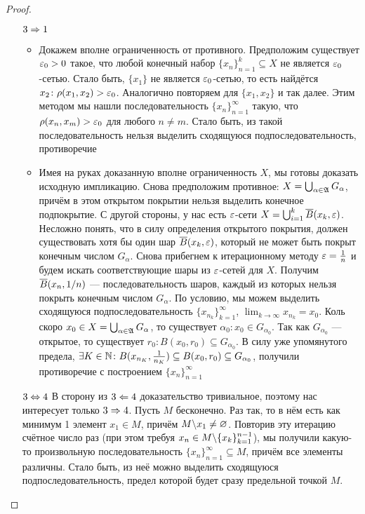 \begin{proof}
\begin{enumerate}
		\item[$3 \Rightarrow 1$] 
		\begin{itemize}
			\item Докажем вполне ограниченность от противного. Предположим существует $\varepsilon_0 > 0$ такое, что любой конечный набор $\{x_n\}_{n = 1}^k \subseteq X$ не является $\varepsilon_0$-сетью. Стало быть, $\{x_1\}$ не является $\varepsilon_0$-сетью, то есть найдётся $x_2 \colon \rho(x_1, x_2) > \varepsilon_0$. Аналогично повторяем для $\{x_1, x_2\}$ и так далее. Этим методом мы нашли последовательность $\{x_n\}_{n = 1}^\infty$ такую, что $\rho(x_n, x_m) > \varepsilon_0$ для любого $n \neq m$. Стало быть, из такой последовательность нельзя выделить сходящуюся подпоследовательность, противоречие
			
			\item Имея на руках доказанную вполне ограниченность $X$, мы готовы доказать исходную импликацию. Снова предположим противное: $X = \bigcup_{\alpha \in \mathfrak{A}} G_\alpha$, причём в этом открытом покрытии нельзя выделить конечное подпокрытие. С другой стороны, у нас есть $\varepsilon$-сети $X = \bigcup_{i = 1}^k \overline{B}(x_k, \varepsilon)$. Несложно понять, что в силу определения открытого покрытия, должен существовать хотя бы один шар $\overline{B}(x_k, \varepsilon)$, который не может быть покрыт конечным числом $G_\alpha$. Снова прибегнем к итерационному методу $\varepsilon = \frac{1}{n}$ и будем искать соответствующие шары из $\varepsilon$-сетей для $X$. Получим $\overline{B}(x_n, 1 / n)$ --- последовательность шаров, каждый из которых нельзя покрыть конечным числом $G_\alpha$. По условию, мы можем выделить сходящуюся подпоследовательность $\{x_{n_k}\}_{k = 1}^\infty$, $\lim_{k \to \infty} x_{n_k} = x_0$. Коль скоро $x_0 \in X = \bigcup_{\alpha \in \mathfrak{A}} G_\alpha$, то существует $\alpha_0 \colon x_0 \in G_{\alpha_0}$. Так как $G_{\alpha_0}$ --- открытое, то существует $r_0 \colon B(x_0, r_0) \subseteq G_{\alpha_0}$. В силу уже упомянутого предела, $\exists K \in \mathbb{N} \colon B(x_{n_K}, \frac{1}{n_K}) \subseteq B(x_0, r_0) \subseteq G_{\alpha_0}$, получили противоречие с построением $\{x_n\}_{n = 1}^\infty$
		\end{itemize}
		
		\item[$3 \Leftrightarrow 4$] В сторону из $3 \Leftarrow 4$ доказательство тривиальное, поэтому нас интересует только $3 \Rightarrow 4$. Пусть $M$ бесконечно. Раз так, то в нём есть как минимум 1 элемент $x_1 \in M$, причём $M \backslash x_1 \neq \varnothing$. Повторив эту итерацию счётное число раз (при этом требуя $x_n \in M \backslash \{x_k\}_{k = 1}^{n - 1}$), мы получили какую-то произвольную последовательность $\{x_n\}_{n = 1}^\infty \subseteq M$, причём все элементы различны. Стало быть, из неё можно выделить сходящуюся подпоследовательность, предел которой будет сразу предельной точкой $M$.
		

\end{enumerate}
\end{proof}
